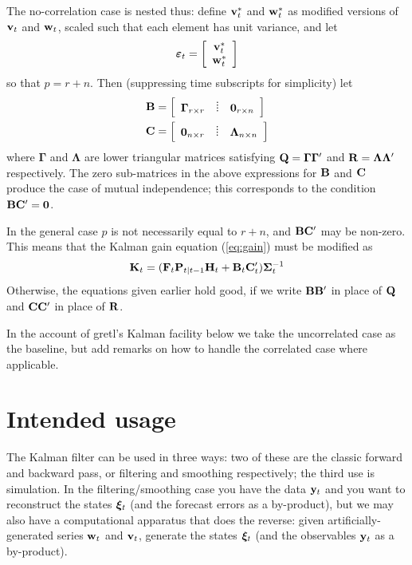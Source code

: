 The no-correlation case is nested thus: define $\mathbf{v}^*_t$ and
$\mathbf{w}^*_t$ as modified versions of $\mathbf{v}_t$ and $\mathbf{w}_t$,
scaled such that each element has unit variance, and let
%
\[
\bm{\varepsilon}_t =
\left[
\begin{array}{c}
  \mathbf{v}^*_t \\ \mathbf{w}^*_t
\end{array}
\right]
\]
%
so that $p = r+n$.  Then (suppressing time subscripts for simplicity)
let 
%
\begin{align*}
  \altstrvar &= \left[
   \begin{array}{ccc} \bm{\Gamma}_{r\times r} & \pdots & 
     \mathbf{0}_{r\times n}\end{array}
  \right] \\
  \altobsvar &= \left[ 
   \begin{array}{ccc} \mathbf{0}_{n\times r} & \pdots & 
   \bm{\Lambda}_{n\times n}\end{array}
  \right]
\end{align*}
%
where $\bm{\Gamma}$ and $\bm{\Lambda}$ are lower triangular matrices
satisfying $\mathbf{Q} = \bm{\Gamma} \bm{\Gamma}'$ and $\mathbf{R} =
\bm{\Lambda} \bm{\Lambda}'$ respectively.  The zero
sub-matrices in the above expressions for $\mathbf{B}$ and
$\mathbf{C}$ produce the case of mutual independence; this corresponds
to the condition $\mathbf{B} \mathbf{C}' = \mathbf{0}$.

In the general case $p$ is not necessarily equal to $r+n$, and
$\mathbf{B} \mathbf{C}'$ may be non-zero.  This means that the
Kalman gain equation (\ref{eq:gain}) must be modified as
%
\begin{equation}
\label{eq:altgain}
\mathbf{K}_t = (\mathbf{F}_t\mathbf{P}_{t|t-1}\mathbf{H}_t + \mathbf{B}_t\mathbf{C}_t')
  \bm{\Sigma}_t^{-1}
\end{equation}
%
Otherwise, the equations given earlier hold good, if we write
$\mathbf{B}\mathbf{B}'$ in place of $\mathbf{Q}$ and
$\mathbf{C}\mathbf{C}'$ in place of $\mathbf{R}$.

In the account of gretl's Kalman facility below we take the
uncorrelated case as the baseline, but add remarks on how to
handle the correlated case where applicable.

\section{Intended usage}

The Kalman filter can be used in three ways: two of these are the
classic forward and backward pass, or filtering and smoothing
respectively; the third use is simulation.  In the
filtering/smoothing case you have the data $\mathbf{y}_t$ and you want to
reconstruct the states $\bm{\xi}_t$ (and the forecast errors as a
by-product), but we may also have a computational apparatus that does
the reverse: given artificially-generated series $\mathbf{w}_t$ and
$\mathbf{v}_t$, generate the states $\bm{\xi}_t$ (and the observables
$\mathbf{y}_t$ as a by-product).

